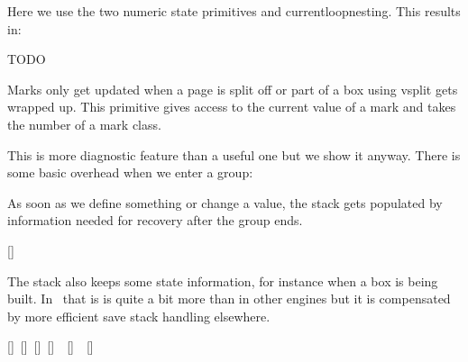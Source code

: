 \typebuffer

Here we use the two numeric state primitives  and \prm
{currentloopnesting}. This results in:

\getbuffer

\stopnewprimitive

\startnewprimitive[title={\prm {currentlysetmathstyle}}]
    TODO
\stopnewprimitive

\startnewprimitive[title={\prm {currentmarks}}]

Marks only get updated when a page is split off or part of a box using \prm
{vsplit} gets wrapped up. This primitive gives access to the current value of a
mark and takes the number of a mark class.

\stopnewprimitive

\startoldprimitive[title={\prm {currentstacksize}}]

This is more diagnostic feature than a useful one but we show it anyway. There is
some basic overhead when we enter a group:

\startbuffer
\bgroup [\the\currentstacksize]
    \bgroup [\the\currentstacksize]
        \bgroup [\the\currentstacksize]
        [\the\currentstacksize] \egroup
    [\the\currentstacksize] \egroup
[\the\currentstacksize] \egroup
\stopbuffer

\typebuffer \getbuffer

As soon as we define something or change a value, the stack gets populated by
information needed for recovery after the group ends.

\startbuffer
\bgroup [\the\currentstacksize]
    \bgroup [\the\currentstacksize]
        \scratchdimen 1pt
        \scratchdimen 2pt
        \bgroup [\the\currentstacksize]
        [\the\currentstacksize] \egroup
    [\the\currentstacksize] \egroup
[\the\currentstacksize] \egroup
\stopbuffer

\typebuffer \getbuffer

The stack also keeps some state information, for instance when a box is being
built. In \LUAMETATEX\ that is is quite a bit more than in other engines but it
is compensated by more efficient save stack handling elsewhere.

\startbuffer
\hbox \bgroup [\the\currentstacksize]
    \hbox \bgroup [\the\currentstacksize]
        \hbox \bgroup [\the\currentstacksize]
        [\the\currentstacksize] \egroup
    [\the\currentstacksize] \egroup
[\the\currentstacksize] \egroup
\stopbuffer

